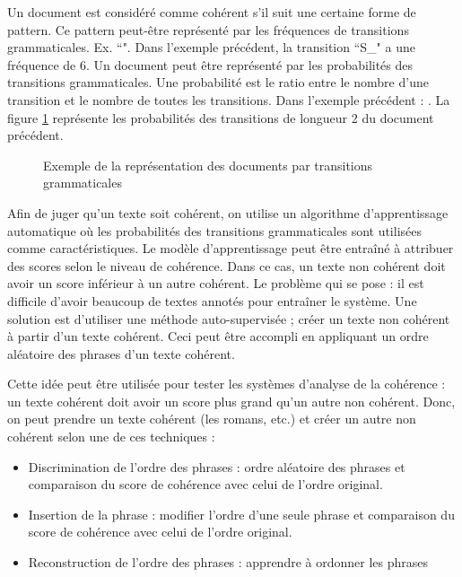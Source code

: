 \documentclass{KodeBook}
\begin{document}
Un document est considéré comme cohérent s'il suit une certaine forme de pattern.
Ce pattern peut-être représenté par les fréquences de transitions grammaticales. Ex. ``".
Dans l'exemple précédent, la transition ``S\_" a une fréquence de 6.
Un document peut être représenté par les probabilités des transitions grammaticales.
Une probabilité est le ratio entre le nombre d'une transition et le nombre de toutes les transitions.
Dans l'exemple précédent : .
La figure \ref{fig:entity-grid-prob} représente les probabilités des transitions de longueur 2 du document précédent.

\begin{figure}[!ht]
	\centering
	\caption[Exemple de la représentation des documents par transitions grammaticales]{Exemple de la représentation des documents par transitions grammaticales \cite{2008-barzilay-lapata}}
	\label{fig:entity-grid-prob}
\end{figure}

Afin de juger qu'un texte soit cohérent, on utilise un algorithme d'apprentissage automatique où les probabilités des transitions grammaticales sont utilisées comme caractéristiques. 
Le modèle d'apprentissage peut être entraîné à attribuer des scores selon le niveau de cohérence.
Dans ce cas, un texte non cohérent doit avoir un score inférieur à un autre cohérent.
Le problème qui se pose : il est difficile d'avoir beaucoup de textes annotés pour entraîner le système.
Une solution est d'utiliser une méthode auto-supervisée ; créer un texte non cohérent à partir d'un texte cohérent. 
Ceci peut être accompli en appliquant un ordre aléatoire des phrases d'un texte cohérent. 

Cette idée peut être utilisée pour tester les systèmes d'analyse de la cohérence : un texte cohérent doit avoir un score plus grand qu'un autre non cohérent. 
Donc, on peut prendre un texte cohérent (les romans, etc.) et créer un autre non cohérent selon une de ces techniques :
\begin{itemize}
	\item Discrimination de l'ordre des phrases : ordre aléatoire des phrases et comparaison du score de cohérence avec celui de l'ordre original.
	\item Insertion de la phrase : modifier l'ordre d'une seule phrase et comparaison du score de cohérence avec celui de l'ordre original.
	\item Reconstruction de l'ordre des phrases : apprendre à ordonner les phrases
\end{itemize}
\end{document}
